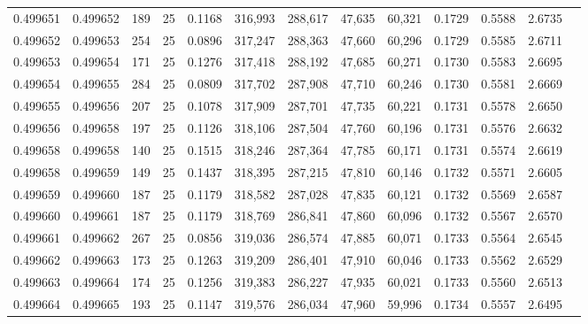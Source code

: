 \begin{tabular}{rrrrrrrrrrrrr}
0.499651 & 0.499652 & 189 &  25 &                                     0.1168 & 316,993 & 288,617 &  47,635 &  60,321 & 0.1729 & 0.5588 & 2.6735 \\
0.499652 & 0.499653 & 254 &  25 &                                     0.0896 & 317,247 & 288,363 &  47,660 &  60,296 & 0.1729 & 0.5585 & 2.6711 \\
0.499653 & 0.499654 & 171 &  25 &                                     0.1276 & 317,418 & 288,192 &  47,685 &  60,271 & 0.1730 & 0.5583 & 2.6695 \\
0.499654 & 0.499655 & 284 &  25 &                                     0.0809 & 317,702 & 287,908 &  47,710 &  60,246 & 0.1730 & 0.5581 & 2.6669 \\
0.499655 & 0.499656 & 207 &  25 &                                     0.1078 & 317,909 & 287,701 &  47,735 &  60,221 & 0.1731 & 0.5578 & 2.6650 \\
0.499656 & 0.499658 & 197 &  25 &                                     0.1126 & 318,106 & 287,504 &  47,760 &  60,196 & 0.1731 & 0.5576 & 2.6632 \\
0.499658 & 0.499658 & 140 &  25 &                                     0.1515 & 318,246 & 287,364 &  47,785 &  60,171 & 0.1731 & 0.5574 & 2.6619 \\
0.499658 & 0.499659 & 149 &  25 &                                     0.1437 & 318,395 & 287,215 &  47,810 &  60,146 & 0.1732 & 0.5571 & 2.6605 \\
0.499659 & 0.499660 & 187 &  25 &                                     0.1179 & 318,582 & 287,028 &  47,835 &  60,121 & 0.1732 & 0.5569 & 2.6587 \\
0.499660 & 0.499661 & 187 &  25 &                                     0.1179 & 318,769 & 286,841 &  47,860 &  60,096 & 0.1732 & 0.5567 & 2.6570 \\
0.499661 & 0.499662 & 267 &  25 &                                     0.0856 & 319,036 & 286,574 &  47,885 &  60,071 & 0.1733 & 0.5564 & 2.6545 \\
0.499662 & 0.499663 & 173 &  25 &                                     0.1263 & 319,209 & 286,401 &  47,910 &  60,046 & 0.1733 & 0.5562 & 2.6529 \\
0.499663 & 0.499664 & 174 &  25 &                                     0.1256 & 319,383 & 286,227 &  47,935 &  60,021 & 0.1733 & 0.5560 & 2.6513 \\
0.499664 & 0.499665 & 193 &  25 &                                     0.1147 & 319,576 & 286,034 &  47,960 &  59,996 & 0.1734 & 0.5557 & 2.6495 \\

\end{tabular}
